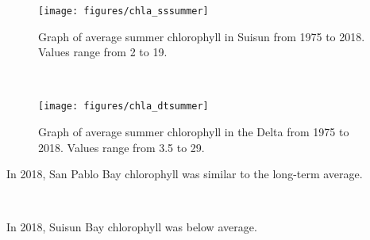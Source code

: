\documentclass[
]{book}
\begin{document}
\begin{panel-grid}
\begin{columns-nocenter}
\begin{column800}

\begin{expand}

\begin{figure}
\texttt{[image: figures/chla\_sssummer]} \caption{Graph of average summer chlorophyll in Suisun from 1975 to 2018. Values range from 2 to 19.}\label{fig:unnamed-chunk-64}
\end{figure}

\end{expand}

\end{column800}

\begin{column40}

~

\end{column40}

\begin{column800}

\begin{expand}

\begin{figure}
\texttt{[image: figures/chla\_dtsummer]} \caption{Graph of average summer chlorophyll in the Delta from 1975 to 2018. Values range from 3.5 to 29.}\label{fig:unnamed-chunk-65}
\end{figure}

\end{expand}

\end{column800}

\end{columns-nocenter}

\begin{columns-nocenter}

\begin{column800}

In 2018, San Pablo Bay chlorophyll was similar to the long-term average.

\end{column800}

\begin{column40}

~

\end{column40}

\begin{column800}

In 2018, Suisun Bay chlorophyll was below average.


\end{column800}
\end{columns-nocenter}
\end{panel-grid}
\end{document}
